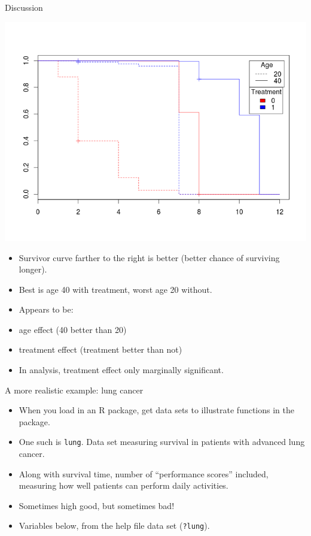 \documentclass[ignorenonframetext,]{beamer}
\begin{document}
\begin{frame}{Discussion}
\protect\hypertarget{discussion}{}

\includegraphics{dance-2.png}

\begin{itemize}
\item
  Survivor curve farther to the right is better (better chance of
  surviving longer).
\item
  Best is age 40 with treatment, worst age 20 without.
\item
  Appears to be:
\item
  age effect (40 better than 20)
\item
  treatment effect (treatment better than not)
\item
  In analysis, treatment effect only marginally significant.
\end{itemize}

\end{frame}

\begin{frame}[fragile]{A more realistic example: lung cancer}
\protect\hypertarget{a-more-realistic-example-lung-cancer}{}

\begin{itemize}
\item
  When you load in an R package, get data sets to illustrate functions
  in the package.
\item
  One such is \texttt{lung}. Data set measuring survival in patients
  with advanced lung cancer.
\item
  Along with survival time, number of ``performance scores'' included,
  measuring how well patients can perform daily activities.
\item
  Sometimes high good, but sometimes bad!
\item
  Variables below, from the help file data set (\texttt{?lung}).
\end{itemize}

\end{frame}
\end{document}
